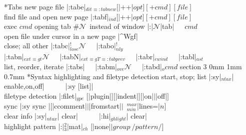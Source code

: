 \documentclass[10pt,a4paper,landscape]{article}
\makeatletter
\renewcommand{\section}{\@startsection		%
	{section}
	{3}
	{0mm}
	{1mm}
	{0.7mm}
	{\normalfont\bfseries\footnotesize}}
\renewcommand{\subsection}{\@startsection
	{section}
	{4}
	{0mm}
	{1mm}
	{0.5mm}
	{\normalfont\bfseries\scriptsize}}
\newcommand{\eqv}[1]{$_{\equiv #1}$}
\newcommand{\opt}[1]{$_{#1}$}
\newcommand{\OPT}[2]{$_{#1}^{#2}$}
\newcommand{\N}{{\footnotesize$\mathcal{N}$}}
\newcommand{\w}{{~~~}}
\makeatother
\begin{document}
\begin{multicols}{4}
{{\subsection*{Tabs}
new page file			    \dotfill|:tabe|\opt{dit}\eqv{:tabnew}$[$|++|$opt] [+cmd] [file]$\\
find file and open new page 	    \dotfill|:tabf|\opt{ind}$[$|++|$opt] [+cmd] [file]$\\
exec $cmd$ opening tab \#\N~instead of window	\dotfill|:|\N|tab|\w$cmd$\\
open file under cursor in a new page	\dotfill|^Wgf|\\
close; all other		    \dotfill|:tabc|\OPT{lose}{!}\N\w|:tabo|\OPT{nly}{!}\\
|:tabn|\opt{ext}\eqv{gt}\N\w|:tabN|\opt{ext}\eqv{gT}\eqv{:tabprev}\w|:tabr|\opt{ewind}\w|:tabl|\opt{ast}\\
list, reorder, iterate			\dotfill|:tabs|\w|:tabm|\opt{ove}\N\w|:tabd|\opt{o}$cmd$
\section*{Syntax highlighting and filetype detection}
start, stop; list	    \dotfill|:sy|\opt{ntax}| enable,on,off|\w\w|:sy [list]|\\
filetype detection	    \dotfill|:filet|\opt{ype} $[$|plugin|$] [$|indent|$] [$|on|$\vert$|off|$]$\\
sync			    \dotfill|:sy sync |$[$|ccomment|$\vert$|fromstart|$\vert$~\OPT{min}{max}|lines=|$n]$\\
clear info		    \dotfill|:sy|\opt{ntax}| clear|\w\w|:hi|\opt{ghlight}| clear|\\
highlight pattern	    \dotfill|:|\OPT{3}{2}|mat|\opt{ch} $[$|none|$\vert group~/pattern/]$
}}
\end{multicols}
\end{document}
